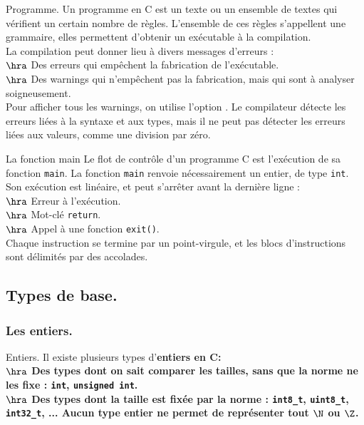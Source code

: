 \documentclass[french, 11pt]{article}
\begin{document}
\begin{defi}{Programme.}{}
    Un programme en C est un texte ou un ensemble de textes qui vérifient un certain nombre de règles.
    L'ensemble de ces règles s'appellent une grammaire, elles permettent d'obtenir un exécutable à la compilation.\\
    La compilation peut donner lieu à divers messages d'erreurs :\\
    $\hra$ Des erreurs qui empêchent la fabrication de l'exécutable.\\
    $\hra$ Des warnings qui n'empêchent pas la fabrication, mais qui sont à analyser soigneusement.\\
    Pour afficher tous les warnings, on utilise l'option .\n
    Le compilateur détecte les erreurs liées à la syntaxe et aux types, mais il ne peut pas détecter les erreurs liées aux valeurs, comme une division par zéro.
\end{defi}

\begin{defi}{La fonction main}{}
    Le flot de contrôle d'un programme C est l'exécution de sa fonction \texttt{main}.\n
    La fonction \texttt{main} renvoie nécessairement un entier, de type \texttt{int}. Son exécution est linéaire, et peut s'arrêter avant la dernière ligne :\\
    $\hra$ Erreur à l'exécution.\\
    $\hra$ Mot-clé \texttt{return}.\\
    $\hra$ Appel à une fonction \texttt{exit()}.\\
    Chaque instruction se termine par un point-virgule, et les blocs d'instructions sont délimités par des accolades.
\end{defi}

\subsection{Types de base.}

\subsubsection{Les entiers.}

\begin{defi}{Entiers.}{}
    Il existe plusieurs types d'\bf{entiers} en C:\\
    $\hra$ Des types dont on sait comparer les tailles, sans que la norme ne les fixe : \texttt{int}, \texttt{unsigned int}.\\
    $\hra$ Des types dont la taille est fixée par la norme : \texttt{int8\_t}, \texttt{uint8\_t}, \texttt{int32\_t}, ...\n
    Aucun type entier ne permet de représenter tout $\N$ ou $\Z$.
\end{defi}
\end{document}
